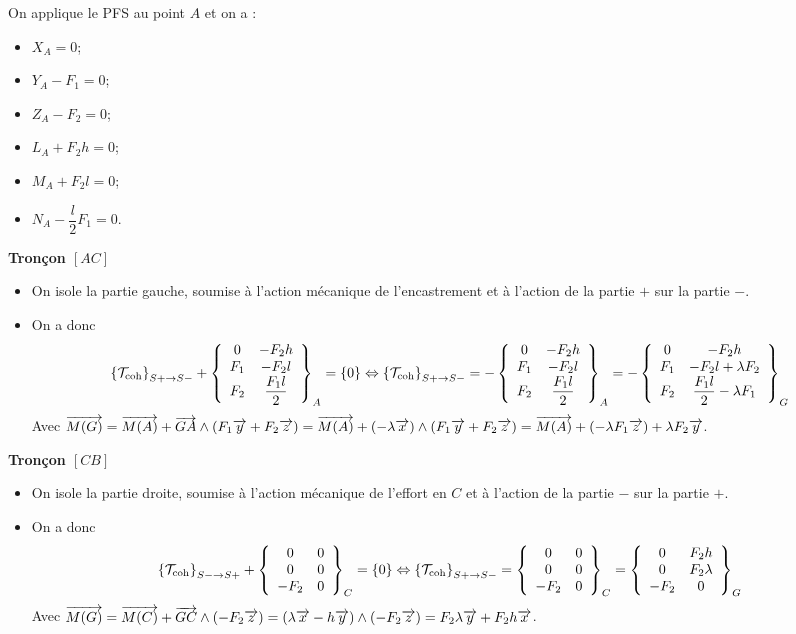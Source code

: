 \documentclass[10pt,fleqn]{article} %
\begin{document}
\begin{multicols}{1}
On applique le PFS au point $A$ et on a : 
\begin{itemize}
\item $X_A=0$;
\item $Y_A - F_1 = 0$;
\item $Z_A - F_2 = 0$;
\item $L_A +F_2h= 0$;
\item $M_A +F_2l=0 $;
\item $N_A -\dfrac{l}{2}F_1=0 $.
\end{itemize}

\textbf{Tronçon $[AC]$}
\begin{itemize}
\item On isole la partie gauche, soumise à l'action mécanique de l'encastrement et à l'action de la partie $+$ sur la partie $-$.
\item On a donc $$
\torseurscoh_{S+\rightarrow S-} +
 \torseurcol{0}{F_1}{F_2}{-F_2h}{-F_2l}{\dfrac{F_1l}{2}}{A} 
 = \{0\} 
 \Leftrightarrow 
 \torseurscoh_{S+\rightarrow S-} 
 =
 -\torseurcol{0}{F_1}{F_2}{-F_2h}{-F_2l}{\dfrac{F_1l}{2}}{A} 
 =
 -\torseurcol{0}{F_1}{F_2}{-F_2h}{-F_2l+\lambda F_2}{\dfrac{F_1l}{2}-\lambda F_1}{G} 
$$
Avec $\vect{M(G)} 
= \vect{M(A)}+\vect{GA}\wedge\left(F_1 \vect{y}+F_2 \vect{z}\right)
= \vect{M(A)}+\left(- \lambda \vect{x}\right)\wedge\left(F_1 \vect{y}+F_2 \vect{z}\right)
= \vect{M(A)}+\left(- \lambda F_1 \vect{z}\right)+\lambda F_2 \vect{y}
$.
\end{itemize}

\textbf{Tronçon $[CB]$}

\begin{itemize}
\item On isole la partie droite, soumise à l'action mécanique de l'effort en $C$ et à l'action de la partie $-$ sur la partie $+$.
\item On a donc $$
\torseurscoh_{S-\rightarrow S+} +
 \torseurcol{0}{0}{-F_2}{0}{0}{0}{C} 
 = \{0\} 
 \Leftrightarrow 
 \torseurscoh_{S+\rightarrow S-} 
 =
 \torseurcol{0}{0}{-F_2}{0}{0}{0}{C} 
 =
  \torseurcol{0}{0}{-F_2}{F_2 h}{F_2 \lambda}{0}{G} 
$$
Avec $\vect{M(G)} 
= \vect{M(C)}+\vect{GC}\wedge\left(-F_2 \vect{z}\right)
= \left(\lambda \vect{x}-h\vect{y} \right)\wedge\left(-F_2 \vect{z}\right)
= F_2\lambda \vect{y}+F_2 h\vect{x} 
$.
\end{itemize}


\end{multicols}
\end{document}
